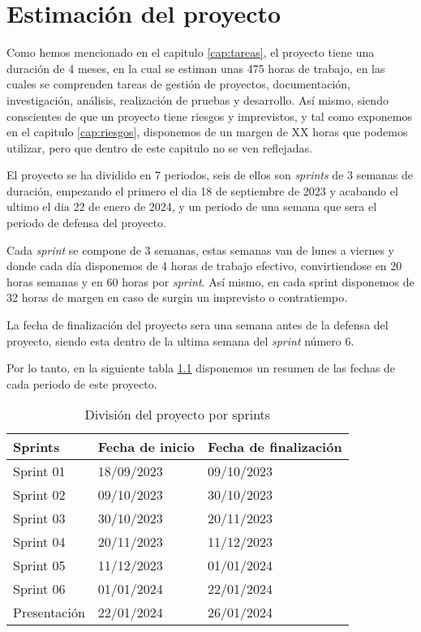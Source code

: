 \chapter{Estimación del proyecto}
\label{cap:estimacion}

Como hemos mencionado en el capitulo \ref{cap:tareas}, el proyecto tiene una duración de 4 meses, en la cual se estiman unas 475 horas de trabajo, en las cuales se 
comprenden tareas de gestión de proyectos, documentación, investigación, análisis, realización de pruebas y desarrollo. Así mismo, siendo conscientes de que un proyecto
tiene riesgos y imprevistos, y tal como exponemos en el capitulo \ref{cap:riesgos}, disponemos de un margen de XX horas que podemos utilizar, pero que dentro de este 
capitulo no se ven reflejadas.

El proyecto se ha dividido en 7 periodos, seis de ellos son \textit{sprints} de 3 semanas de duración, empezando el primero el dia 18 de septiembre de 2023 y acabando el ultimo 
el dia 22 de enero de 2024, y un periodo de una semana que sera el periodo de defensa del proyecto.

Cada \textit{sprint} se compone de 3 semanas, estas semanas van de lunes a viernes y donde cada día disponemos de 4 horas de trabajo efectivo, convirtiendose en 20 horas semanas
y en 60 horas por \textit{sprint}. Así mismo, en cada sprint disponemos de 32 horas de margen en caso de surgin un imprevisto o contratiempo.

La fecha de finalización del proyecto sera una semana antes de la defensa del proyecto, siendo esta dentro de la ultima semana del \textit{sprint} número 6.

Por lo tanto, en la siguiente tabla \ref{tab:proyecto_estimacion} disponemos un resumen de las fechas de cada periodo de este proyecto.

\begin{table}[H]
    \centering
    \begin{tabular}{|l|l|l|}
    \hline
    \rowcolor[HTML]{8EA9D8} 
    Sprints      & Fecha de inicio & Fecha de finalización \\ \hline
    Sprint 01    & 18/09/2023      & 09/10/2023            \\ \hline
    Sprint 02    & 09/10/2023      & 30/10/2023            \\ \hline
    Sprint 03    & 30/10/2023      & 20/11/2023            \\ \hline
    Sprint 04    & 20/11/2023      & 11/12/2023            \\ \hline
    Sprint 05    & 11/12/2023      & 01/01/2024            \\ \hline
    Sprint 06    & 01/01/2024      & 22/01/2024            \\ \hline
    Presentación & 22/01/2024      & 26/01/2024            \\ \hline
    \end{tabular}
    \caption{División del proyecto por sprints}
    \label{tab:proyecto_estimacion}
\end{table}

